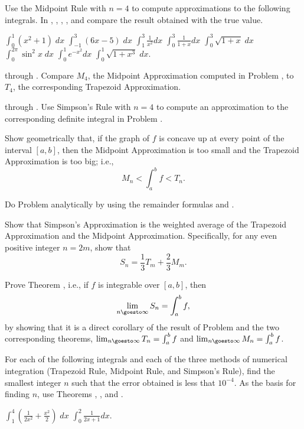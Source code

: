 \begin{exercises}

Use the Midpoint Rule with $n=4$ to compute
approximations to the following integrals.
In , , ,
, and  compare
the result obtained with the true value.
\begin{exenum}
\x
{}
$\int_0^1 (x^2+1)\;dx$
\x
{}
$\int_{-1}^3 (6x-5)\;dx$
\x
{}
$\int_1^3 \frac1{x^2} dx$
\x
{}
$\int_0^3 \frac1{1+x} dx$
\x
{}
$\int_0^3 \sqrt{1+x}\;dx$
\x
$\int_0^{2\pi} \sin^2x\;dx$
\x
$\int_0^1 e^{-x^2} dx$
\x
{}
$\int_0^1 \sqrt{1+x^3}\; dx$.
\end{exenum}

 through .
Compare $M_4$, the Midpoint Approximation
computed in Problem , to
$T_4$, the corresponding
Trapezoid Approximation.

 through .
Use Simpson's Rule with $n=4$ to compute
an approximation to the corresponding definite
integral in Problem .

Show geometrically that, if the graph of $f$
is concave up at every point of the interval
$[a,b]$, then the Midpoint Approximation
is too small and the Trapezoid Approximation
is too big; i.e.,
\[
M_n < \int_a^b f < T_n
.
\]

Do Problem  analytically
by using the remainder formulas
 and .

Show that Simpson's Approximation is the
weighted average of the Trapezoid Approximation
and the Midpoint Approximation.
Specifically, for any even positive integer
$n=2m$, show that
\[
S_n = \frac13T_m + \frac23 M_m
.
\]

Prove Theorem , i.e.,
if $f$ is integrable over $[a,b]$, then
\[
\lim_{n\goesto\infty} S_n = \int_a^b f
,
\]
by showing that it is a direct corollary of the
result of Problem  and the two
corresponding theorems,
$\lim_{n\goesto\infty}T_n=\int_a^b f$ and
$\lim_{n\goesto\infty}M_n=\int_a^b f$.

For each of the following integrals and each of
the three methods of numerical integration
(Trapezoid Rule, Midpoint Rule, and
Simpson's Rule), find the smallest integer $n$
such that the error obtained is less that
$10^{-4}$.
As the basis for finding $n$, use Theorems
, , and .
\begin{exenum}
\x
$\int_1^4 \left(\frac1{2x^2} + \frac{x^2}2\right)\;dx$
\x
$\int_0^2 \frac1{2x+1} dx$.
\end{exenum}


\end{exercises}
